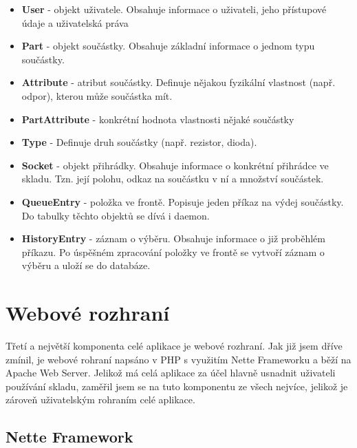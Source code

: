 \documentclass[12pt, a4paper, oneside]{article}
\begin{document}
\begin{itemize}
\item \textbf{User} - objekt uživatele. Obsahuje informace o uživateli, jeho přístupové údaje a uživatelská práva
\item \textbf{Part} - objekt součástky. Obsahuje základní informace o jednom typu součástky.
\item \textbf{Attribute} - atribut součástky. Definuje nějakou fyzikální vlastnost (např. odpor), kterou může součástka mít.
\item \textbf{PartAttribute} - konkrétní hodnota vlastnosti nějaké součástky
\item \textbf{Type} - Definuje druh součástky (např. rezistor, dioda).
\item \textbf{Socket} - objekt přihrádky. Obsahuje informace o konkrétní přihrádce ve skladu. Tzn. její polohu, odkaz na součástku v ní a množství součástek.
\item \textbf{QueueEntry} - položka ve frontě. Popisuje jeden příkaz na výdej součástky. Do tabulky těchto objektů se dívá i daemon.
\item \textbf{HistoryEntry} - záznam o výběru. Obsahuje informace o již proběhlém příkazu. Po úspěšném zpracování položky ve frontě se vytvoří záznam o výběru a uloží se do databáze.
\end{itemize}

\newpage

\section{Webové rozhraní}  %

Třetí a největší komponenta celé aplikace je webové rozhraní. Jak již jsem dříve zmínil, je webové rohraní napsáno v PHP s využitím Nette Frameworku a běží na Apache Web Server. Jelikož má celá aplikace za účel hlavně usnadnit uživateli používání skladu, zaměřil jsem se na tuto komponentu ze všech nejvíce, jelikož je zároveň uživatelským rohraním celé aplikace.

\subsection{Nette Framework}
\end{document}
